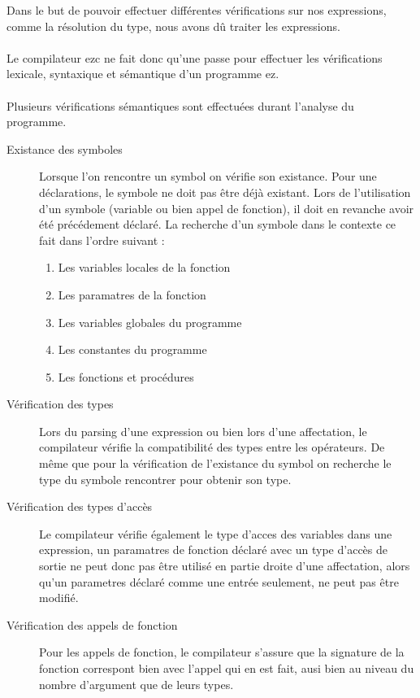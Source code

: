 Dans le but de pouvoir effectuer différentes vérifications sur nos expressions, 
comme la résolution du type, nous avons dû traiter les expressions.


\paragraph{}Le compilateur ezc ne fait donc qu'une passe pour effectuer les 
vérifications lexicale, syntaxique et sémantique d'un programme ez.

\paragraph{}Plusieurs vérifications sémantiques sont effectuées durant 
l'analyse du programme.

\begin{description}
 \item[Existance des symboles] Lorsque l'on rencontre un symbol on vérifie son 
existance. Pour une déclarations, le symbole ne doit pas être déjà existant. 
Lors de l'utilisation d'un symbole (variable ou bien appel de fonction), il doit
en revanche avoir été précédement déclaré. La recherche d'un symbole dans le
contexte ce fait dans l'ordre suivant :

 \begin{enumerate}
  \item Les variables locales de la fonction
  \item Les paramatres de la fonction
  \item Les variables globales du programme
  \item Les constantes du programme
  \item Les fonctions et procédures
 \end{enumerate}

 \item[Vérification des types] Lors du parsing d'une expression ou bien lors 
d'une affectation, le compilateur vérifie la compatibilité des types entre les
opérateurs. De même que pour la vérification de l'existance du symbol
on recherche le type du symbole rencontrer pour obtenir son type.

 \item[Vérification des types d'accès] Le compilateur vérifie également le type
d'acces des variables dans une expression, un paramatres de fonction
déclaré avec un type d'accès de sortie ne peut donc pas être utilisé en partie 
droite d'une affectation, alors qu'un parametres déclaré comme une entrée
seulement, ne peut pas être modifié.
 
 \item[Vérification des appels de fonction] Pour les appels de fonction, le 
compilateur s'assure que la signature de la fonction correspont bien avec 
l'appel qui en est fait, ausi bien au niveau du nombre d'argument que de leurs 
types.
\end{description}

